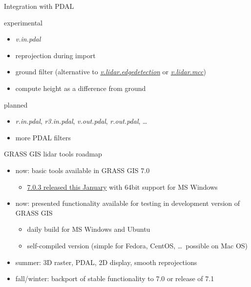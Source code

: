 \documentclass[xcolor={dvipsnames,usenames},beamer,aspectratio=169]{beamer}
\newcommand{\gmodule}[1]{\href{http://grass.osgeo.org/grass71/manuals/#1.html}{\emph{#1}}}
\newcommand{\module}[1]{\emph{#1}}
\begin{document}
\begin{frame}{Integration with PDAL}

\begin{block}{experimental}
 \begin{itemize}
  \item \module{v.in.pdal}
  \item reprojection during import
  \item ground filter
    (alternative to \gmodule{v.lidar.edgedetection} or \gmodule{v.lidar.mcc})
  \item compute height as a difference from ground
 \end{itemize}
\end{block}

\begin{block}{planned}
 \begin{itemize}
  \item \module{r.in.pdal}, \module{r3.in.pdal}, \module{v.out.pdal}, \module{r.out.pdal}, \ldots
  \item more PDAL filters
 \end{itemize}
\end{block}

\end{frame}


\begin{frame}{GRASS GIS lidar tools roadmap}

 \begin{itemize}
  \item now: basic tools available in GRASS GIS 7.0
    \begin{itemize}
      \item \href{https://grass.osgeo.org/news/54/15/GRASS-GIS-7-0-3-released/}{7.0.3 released this January}
        with 64bit support for MS Windows
    \end{itemize}
  \item now: presented functionality available for testing in development version of GRASS GIS
    \begin{itemize}
      \item daily build for MS Windows and Ubuntu
      \item self-compiled version (simple for Fedora, CentOS, \ldots\ possible on Mac OS)
    \end{itemize}
  \item summer: 3D raster, PDAL, 2D display, smooth reprojections
  \item fall/winter: backport of stable functionality to 7.0 or release of 7.1
 \end{itemize}

\end{frame}
\end{document}
